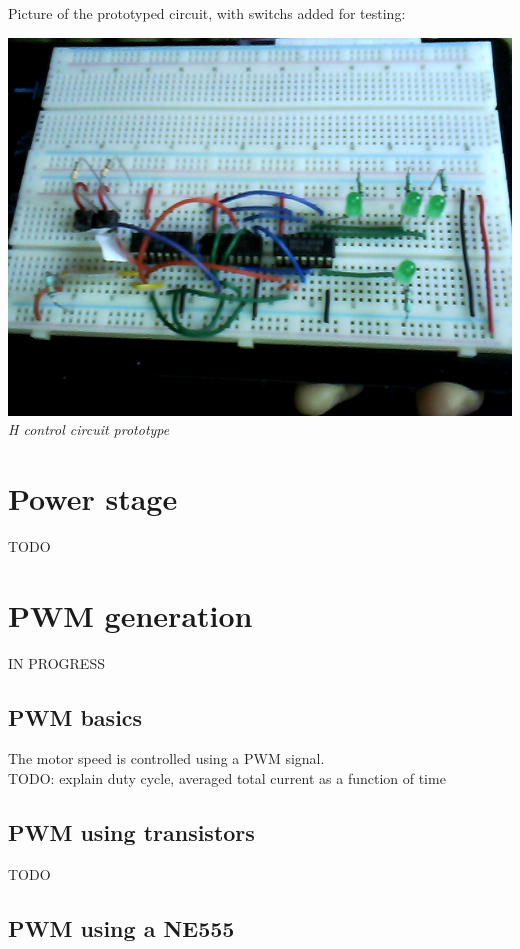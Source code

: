 \documentclass[12pt]{article}
\begin{document}
\smallskip
\pagebreak
Picture of the prototyped circuit, with switchs added for testing:
\begin{center}
  \includegraphics[keepaspectratio=true, width=1.\textwidth]{../pics/h_control_breadboard.png}
  \\
  \smallskip
  \tiny{\textit{H control circuit prototype}}
\end{center}


\newpage
\section{Power stage}
TODO


\newpage
\section{PWM generation}
IN PROGRESS

\subsection{PWM basics}
The motor speed is controlled using a PWM signal.\\
TODO: explain duty cycle, averaged total current as a function of time

\subsection{PWM using transistors}
TODO

\subsection{PWM using a NE555}
\end{document}
